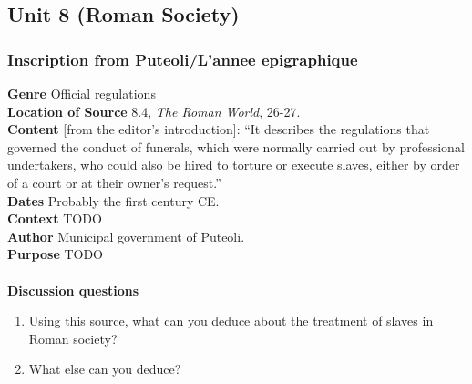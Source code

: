 \documentclass{article}
\begin{document}
\subsection*{Unit 8 (Roman Society)}
\subsubsection*{Inscription from Puteoli/L’annee epigraphique}
\textbf{Genre}
Official regulations \\
\textbf{Location of Source}
8.4, \textit{The Roman World}, 26-27. \\
\textbf{Content}
[from the editor’s introduction]: “It describes the regulations that governed the conduct of funerals, which were normally carried out by professional undertakers, who could also be hired to torture or execute slaves, either by order of a court or at their owner’s request.” \\
\textbf{Dates}
Probably the first century CE. \\
\textbf{Context}
TODO \\
\textbf{Author}
Municipal government of Puteoli. \\
\textbf{Purpose}
TODO \\
\\
\textbf{Discussion questions}
\begin{enumerate}
  \item Using this source, what can you deduce about the treatment of slaves in Roman society?
  \item What else can you deduce?
\end{enumerate}
\end{document}
